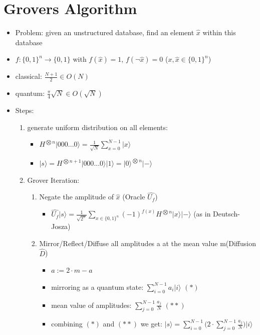 \documentclass[12pt,a4paper]{article}
\newcommand{\ecb}[1]{\{#1\}}
\newcommand{\ket}[1]{\vert #1 \rangle}
\begin{document}
\section{Grovers Algorithm}
\begin{itemize}
\item Problem: given an unstructured database, find an element $\hat{x}$ within this database
\item $f : \ecb{0,1}^n \rightarrow \ecb{0,1}$ with $f(\hat{x}) = 1$, $f(\lnot \hat{x}) = 0$ \hspace{1cm}($x, \hat{x} \in \ecb{0,1}^n$)
\item classical: $\frac{N+1}{2} \in O(N)$
\item quantum: $\frac{\pi}{4}\sqrt{N} \in O(\sqrt{N})$
\item Steps:
\begin{enumerate}
\item generate uniform distribution on all elements:\\
\begin{itemize}
\item $\displaystyle H^{\bigotimes n}\ket{000...0}=\frac{1}{\sqrt{N}} \sum_{x=0}^{N-1} \ket{x}$
\item $\displaystyle\ket{s} = H^{\bigotimes n+1} \ket{000...0}\ket{1} = \ket{0}^{\bigotimes n}\ket{-}$
\end{itemize}
\item Grover Iteration:
\begin{enumerate}
\item Negate the amplitude of $\hat{x}$ (Oracle $\hat{U_f}$)
\begin{itemize}
\item $\displaystyle \hat{U_f}\ket{s} = \frac{1}{\sqrt{2^n}} \sum_{x\in\ecb{0,1}^n} (-1)^{f(x)}H^{\bigotimes n}\ket{x}\ket{-}$ \hspace{0.2cm}(as in Deutsch-Josza)
\end{itemize}
\item Mirror/Reflect/Diffuse all amplitudes a at the mean value m(Diffusion $\hat{D}$)
\begin{itemize}
\item $a := 2\cdot m - a$
\item mirroring as a quantum state: $\displaystyle \sum_{i=0}^{N-1} a_i \ket{i}$ $(\ast)$
\item mean value of amplitudes: $\displaystyle \sum_{j=0}^{N-1} \frac{a_j}{N}$ $(\ast\ast)$
\item combining $(\ast)$ and $(\ast\ast)$ we get: $\displaystyle\ket{s} = \sum_{i=0}^{N-1} \bigg( 2\cdot \sum_{j=0}^{N-1} \frac{a_j}{N}\bigg) \ket{i}$

\end{itemize}
\end{enumerate}
\end{enumerate}
\end{itemize}
\end{document}
